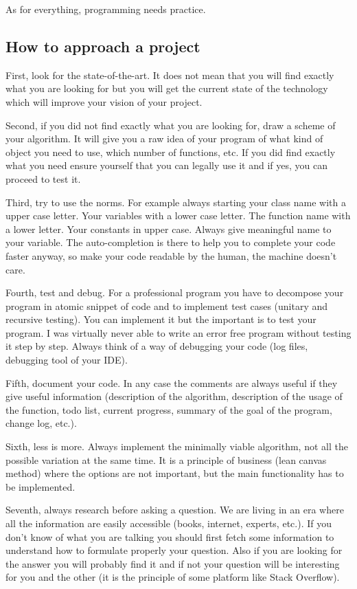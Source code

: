 \documentclass[english, 12 pt, openany, oneside]{book}
\begin{document}
As for everything, programming needs practice.

\subsection{How to approach a project}
First, look for the state-of-the-art. It does not mean that you will find exactly what you are looking for but you will get the current state of the technology which will improve your vision of your project.

Second, if you did not find exactly what you are looking for, draw a scheme of your algorithm. It will give you a raw idea of your program of what kind of object you need to use, which number of functions, etc. If you did find exactly what you need ensure yourself that you can legally use it and if yes, you can proceed to test it.

Third, try to use the norms. For example always starting your class name with a upper case letter. Your variables with a lower case letter. The function name with a lower letter. Your constants in upper case. Always give meaningful name to your variable. The auto-completion is there to help you to complete your code faster anyway, so make your code readable by the human, the machine doesn't care.

Fourth, test and debug. For a professional program you have to decompose your program in atomic snippet of code and to implement test cases (unitary and recursive testing). You can implement it but the important is to test your program. I was virtually never able to write an error free program without testing it step by step. Always think of a way of debugging your code (log files, debugging tool of your IDE).

Fifth, document your code. In any case the comments are always useful if they give useful information (description of the algorithm, description of the usage of the function, todo list, current progress, summary of the goal of the program, change log, etc.).

Sixth, less is more. Always implement the minimally viable algorithm, not all the possible variation at the same time. It is a principle of business (lean canvas method) where the options are not important, but the main functionality has to be implemented.

Seventh, always research before asking a question. We are living in an era where all the information are easily accessible (books, internet, experts, etc.). If you don't know of what you are talking you should first fetch some information to understand how to formulate properly your question. Also if you are looking for the answer you will probably find it and if not your question will be interesting for you and the other (it is the principle of some platform like Stack Overflow).
\end{document}
